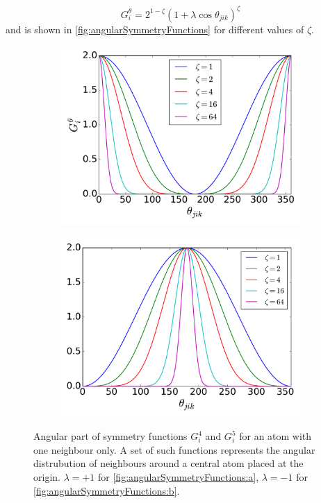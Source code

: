 \documentclass[twoside,english]{uiofysmaster}
\begin{document}
\begin{equation}
 G_i^\theta = 2^{1-\zeta}(1 + \lambda \cos\theta_{jik})^\zeta
\end{equation}
and is shown in \autoref{fig:angularSymmetryFunctions} for different values of $\zeta$. 
\begin{figure}
  \begin{subfigure}{0.5\linewidth}
    \centering
    \includegraphics[width=\linewidth]{Figures/Theory/G4G5angular1.pdf}
    \subcaption{}
    \label{fig:angularSymmetryFunctions:a} 
  \end{subfigure}%
  \begin{subfigure}{0.5\linewidth}
    \centering
    \includegraphics[width=\linewidth]{Figures/Theory/G4G5angular2.pdf} 
    \subcaption{}
    \label{fig:angularSymmetryFunctions:b} 
  \end{subfigure} 
  \caption{Angular part of symmetry functions $G_i^4$ and $G_i^5$ for an atom with one neighbour only. A set of such 
	   functions represents the angular distrubution of neighbours around a central atom placed at the origin.
	   $\lambda = +1$ for \autoref{fig:angularSymmetryFunctions:a}, $\lambda=-1$ for \autoref{fig:angularSymmetryFunctions:b}.}
 \label{fig:angularSymmetryFunctions} 
\end{figure}
\end{document}
